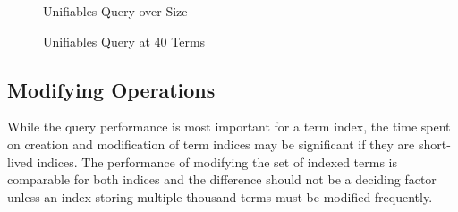 \begin{figure}[h]
  \begin{minipage}{0.45\textwidth}
\begin{adjustbox}{width=1\textwidth}
\end{adjustbox}
\caption{Unifiables Query over Size}
\label{unif}
\end{minipage}
\begin{minipage}{0.1\textwidth}
\end{minipage}
\begin{minipage}{0.45\textwidth}
\begin{adjustbox}{width=1\textwidth}
\end{adjustbox}
\caption{Unifiables Query at 40 Terms}
\label{unifvar}
\end{minipage}
\end{figure}

\subsection{Modifying Operations}
While the query performance is most important for a term index, the time spent on creation and modification of term indices may be significant if they are short-lived indices. The performance of modifying the set of indexed terms is comparable for both indices and the difference should not be a deciding factor unless an index storing multiple thousand terms must be modified frequently.

